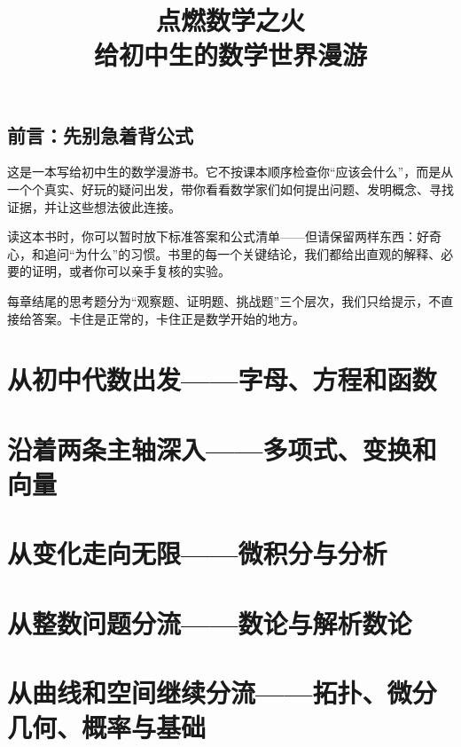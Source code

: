 \documentclass[11pt,openany,fontset=none]{ctexbook}
\title{\sffamily\bfseries 点燃数学之火\\[2mm] {\large 给初中生的数学世界漫游}}
\author{}
\date{}
\theoremstyle{definition}
\theoremstyle{plain}
\theoremstyle{remark}
\begin{document}
\frontmatter
\maketitle
\tableofcontents

\chapter*{前言：先别急着背公式}
这是一本写给初中生的数学漫游书。它不按课本顺序检查你“应该会什么”，而是从一个个真实、好玩的疑问出发，带你看看数学家们如何提出问题、发明概念、寻找证据，并让这些想法彼此连接。

读这本书时，你可以暂时放下标准答案和公式清单——但请保留两样东西：好奇心，和追问“为什么”的习惯。书里的每一个关键结论，我们都给出直观的解释、必要的证明，或者你可以亲手复核的实验。

每章结尾的思考题分为“观察题、证明题、挑战题”三个层次，我们只给提示，不直接给答案。卡住是正常的，卡住正是数学开始的地方。

\mainmatter

\part{从初中代数出发——字母、方程和函数}





\part{沿着两条主轴深入——多项式、变换和向量}





\part{从变化走向无限——微积分与分析}





\part{从整数问题分流——数论与解析数论}




\part{从曲线和空间继续分流——拓扑、微分几何、概率与基础}






\appendix





\end{document}
